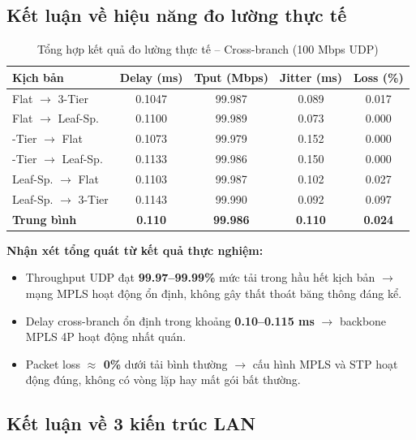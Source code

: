 \subsection{Kết luận về hiệu năng đo lường thực tế}

\begin{table}[H]
    \centering
    \caption{Tổng hợp kết quả đo lường thực tế -- Cross-branch (100 Mbps UDP)}
    \vspace{0.2cm}
    \small
    \begin{tabularx}{\textwidth}{|>{\raggedright\arraybackslash}p{2.8cm}|c|c|c|c|}
        \hline
        \textbf{Kịch bản} & \textbf{Delay (ms)} & \textbf{Tput (Mbps)} & \textbf{Jitter (ms)} & \textbf{Loss (\%)} \\ \hline
        Flat $\to$ 3-Tier & 0.1047 & 99.987 & 0.089 & 0.017 \\ \hline
        Flat $\to$ Leaf-Sp. & 0.1100 & 99.989 & 0.073 & 0.000 \\ \hline
        3-Tier $\to$ Flat & 0.1073 & 99.979 & 0.152 & 0.000 \\ \hline
        3-Tier $\to$ Leaf-Sp. & 0.1133 & 99.986 & 0.150 & 0.000 \\ \hline
        Leaf-Sp. $\to$ Flat & 0.1103 & 99.987 & 0.102 & 0.027 \\ \hline
        Leaf-Sp. $\to$ 3-Tier & 0.1143 & 99.990 & 0.092 & 0.097 \\ \hline
        \textbf{Trung bình} & \textbf{0.110} & \textbf{99.986} & \textbf{0.110} & \textbf{0.024} \\ \hline
    \end{tabularx}
    \label{tab:summary_cross}
\end{table}

\textbf{Nhận xét tổng quát từ kết quả thực nghiệm:}
\begin{itemize}
    \item Throughput UDP đạt \textbf{99.97--99.99\%} mức tải trong hầu hết kịch bản $\to$ mạng MPLS hoạt động ổn định, không gây thất thoát băng thông đáng kể.
    \item Delay cross-branch ổn định trong khoảng \textbf{0.10--0.115 ms} $\to$ backbone MPLS 4P hoạt động nhất quán.
    \item Packet loss \textbf{$\approx$ 0\%} dưới tải bình thường $\to$ cấu hình MPLS và STP hoạt động đúng, không có vòng lặp hay mất gói bất thường.
\end{itemize}

\subsection{Kết luận về 3 kiến trúc LAN}

